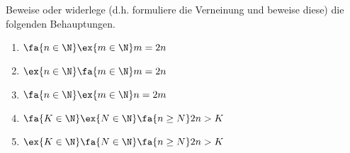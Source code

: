 \begin{exercise}
  Beweise oder widerlege (d.h. formuliere die Verneinung und beweise diese) die
  folgenden Behauptungen.
  \begin{enumerate}
  \item $\fa{n \in \N} \ex{m \in \N} m = 2n$
  \item $\ex{n \in \N} \fa{m \in \N} m = 2n$
  \item $\fa{n \in \N} \ex{m \in \N} n = 2m$
  \item $\fa{K \in \N} \ex{N \in \N} \fa{n \geq N} 2n > K$
  \item $\ex{K \in \N} \fa{N \in \N} \fa{n \geq N} 2n > K$
  \end{enumerate}
\end{exercise}
